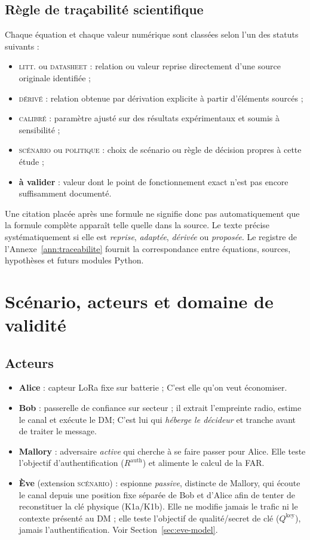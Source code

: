 \documentclass[conference,a4paper]{IEEEtran}
\newcommand{\statusData}{\textsc{datasheet}}
\newcommand{\statusLit}{\textsc{litt.}}
\newcommand{\statusDer}{\textsc{dérivé}}
\newcommand{\statusScen}{\textsc{scénario}}
\newcommand{\statusPol}{\textsc{politique}}
\newcommand{\statusCal}{\textsc{calibré}}
\newcommand{\statusVal}{\textcolor{red!70!black}{\textbf{à valider}}}
\newcommand{\Rauth}{R^{\mathrm{auth}}}
\newcommand{\Rkey}{Q^{\mathrm{key}}}
\begin{document}
\subsection{Règle de traçabilité scientifique}
Chaque équation et chaque valeur numérique sont classées selon l'un des statuts suivants :
\begin{itemize}
    \item \statusLit{} ou \statusData{} : relation ou valeur reprise directement d'une source originale identifiée ;
    \item \statusDer{} : relation obtenue par dérivation explicite à partir d'éléments sourcés ;
    \item \statusCal{} : paramètre ajusté sur des résultats expérimentaux et soumis à sensibilité ;
    \item \statusScen{} ou \statusPol{} : choix de scénario ou règle de décision propres à cette étude ;
    \item \statusVal{} : valeur dont le point de fonctionnement exact n'est pas encore suffisamment documenté.
\end{itemize}
Une citation placée après une formule ne signifie donc pas automatiquement que la formule complète apparaît telle quelle dans la source. Le texte précise systématiquement si elle est \emph{reprise}, \emph{adaptée}, \emph{dérivée} ou \emph{proposée}. Le registre de l'Annexe~\ref{ann:traceabilite} fournit la correspondance entre équations, sources, hypothèses et futurs modules Python.


\section{Scénario, acteurs et domaine de validité}

\subsection{Acteurs}
\begin{itemize}
    \item \textbf{Alice} : capteur LoRa fixe sur batterie ; C'est elle qu'on veut économiser.
    \item \textbf{Bob} : passerelle de confiance sur secteur ; il extrait l'empreinte radio, estime le canal et exécute le DM; C'est
lui qui \emph{héberge le décideur} et tranche avant de traiter le message.
    \item \textbf{Mallory} : adversaire \emph{active} qui cherche à se faire passer pour Alice. Elle teste l'objectif d'authentification ($\Rauth$) et alimente le calcul de la FAR.
    \item \textbf{Ève} (extension \statusScen{}) : espionne \emph{passive}, distincte de Mallory, qui écoute le canal depuis une position fixe séparée de Bob et d'Alice afin de tenter de reconstituer la clé physique (K1a/K1b). Elle ne modifie jamais le trafic ni le contexte présenté au DM ; elle teste l'objectif de qualité/secret de clé ($\Rkey$), jamais l'authentification. Voir Section~\ref{sec:eve-model}.
\end{itemize}
\end{document}
